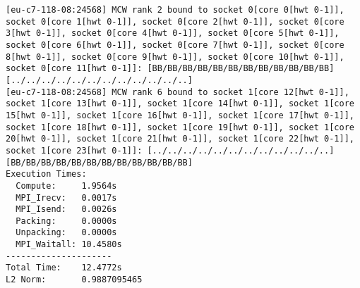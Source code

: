 \begin{lstlisting}[basicstyle=\tiny, frame=single, caption={Task 2: Collected Euler outputs.}, label={lst:1}]
[eu-c7-118-08:24568] MCW rank 2 bound to socket 0[core 0[hwt 0-1]], socket 0[core 1[hwt 0-1]], socket 0[core 2[hwt 0-1]], socket 0[core 3[hwt 0-1]], socket 0[core 4[hwt 0-1]], socket 0[core 5[hwt 0-1]], socket 0[core 6[hwt 0-1]], socket 0[core 7[hwt 0-1]], socket 0[core 8[hwt 0-1]], socket 0[core 9[hwt 0-1]], socket 0[core 10[hwt 0-1]], socket 0[core 11[hwt 0-1]]: [BB/BB/BB/BB/BB/BB/BB/BB/BB/BB/BB/BB][../../../../../../../../../../../..]
[eu-c7-118-08:24568] MCW rank 6 bound to socket 1[core 12[hwt 0-1]], socket 1[core 13[hwt 0-1]], socket 1[core 14[hwt 0-1]], socket 1[core 15[hwt 0-1]], socket 1[core 16[hwt 0-1]], socket 1[core 17[hwt 0-1]], socket 1[core 18[hwt 0-1]], socket 1[core 19[hwt 0-1]], socket 1[core 20[hwt 0-1]], socket 1[core 21[hwt 0-1]], socket 1[core 22[hwt 0-1]], socket 1[core 23[hwt 0-1]]: [../../../../../../../../../../../..][BB/BB/BB/BB/BB/BB/BB/BB/BB/BB/BB/BB]
Execution Times:
  Compute:     1.9564s
  MPI_Irecv:   0.0017s
  MPI_Isend:   0.0026s
  Packing:     0.0000s
  Unpacking:   0.0000s
  MPI_Waitall: 10.4580s
---------------------
Total Time:    12.4772s
L2 Norm:       0.9887095465

\end{lstlisting}
